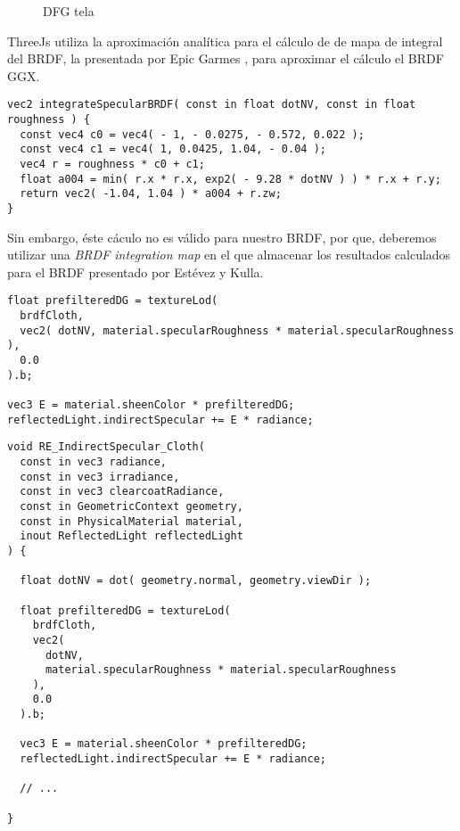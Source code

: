       \begin{figure}[H]
        \vspace{0.5cm}
        \centering
        \caption{DFG tela}
      \end{figure}

      ThreeJs utiliza la aproximaci\'on anal\'itica para el c\'alculo de de mapa de integral del BRDF,
      la presentada por Epic Garmes \autocite{shadingmobile}, para aproximar el c\'alculo el BRDF GGX.\\

      \begin{lstlisting}[caption=Apromixaci\'on anal\'itica a la integral del BRDF en ThreeJs]
vec2 integrateSpecularBRDF( const in float dotNV, const in float roughness ) {
  const vec4 c0 = vec4( - 1, - 0.0275, - 0.572, 0.022 );
  const vec4 c1 = vec4( 1, 0.0425, 1.04, - 0.04 );
  vec4 r = roughness * c0 + c1;
  float a004 = min( r.x * r.x, exp2( - 9.28 * dotNV ) ) * r.x + r.y;
  return vec2( -1.04, 1.04 ) * a004 + r.zw;
}
      \end{lstlisting}
      \singlespacing

      Sin embargo, \'este c\'aculo no es v\'alido para nuestro BRDF, por que, deberemos utilizar una
      \textit{BRDF integration map} en el que almacenar los resultados calculados para el BRDF presentado por Est\'evez y Kulla.
    \egroup


    \begin{lstlisting}
float prefilteredDG = textureLod(
  brdfCloth,
  vec2( dotNV, material.specularRoughness * material.specularRoughness ),
  0.0
).b;

vec3 E = material.sheenColor * prefilteredDG;
reflectedLight.indirectSpecular += E * radiance;
    \end{lstlisting}
    \singlespacing

    \begin{lstlisting}
void RE_IndirectSpecular_Cloth(
  const in vec3 radiance,
  const in vec3 irradiance,
  const in vec3 clearcoatRadiance,
  const in GeometricContext geometry,
  const in PhysicalMaterial material,
  inout ReflectedLight reflectedLight
) {

  float dotNV = dot( geometry.normal, geometry.viewDir );

  float prefilteredDG = textureLod(
    brdfCloth,
    vec2(
      dotNV,
      material.specularRoughness * material.specularRoughness
    ),
    0.0
  ).b;

  vec3 E = material.sheenColor * prefilteredDG;
  reflectedLight.indirectSpecular += E * radiance;

  // ...

}
    \end{lstlisting}
    \singlespacing

